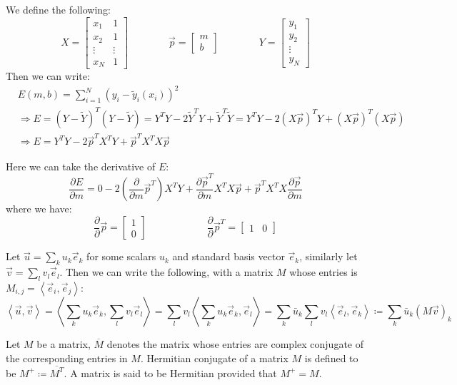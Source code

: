\documentclass[11pt]{article}
\theoremstyle{break}
\theoremstyle{break}
\begin{document}
We define the following:
$$X = \begin{bmatrix}
x_1 & 1 \\ x_2 & 1 \\ \vdots & \vdots \\ x_N &1 
\end{bmatrix} \qquad\qquad \vec{p} = \begin{bmatrix} m \\ b \end{bmatrix}
\qquad\qquad Y = \begin{bmatrix}
y_1\\ y_2 \\\vdots \\ y_N
\end{bmatrix} $$
Then we can write:
\begin{align*}
&E(m,b) =\sum_{i=1}^N ( y_i - \widetilde{y}_i(x_i) )^2 \\
&\Rightarrow E = (Y-\widetilde{Y})^T(Y-\widetilde{Y}) = Y^TY - 2\widetilde{Y}^TY + \widetilde{Y}^T\widetilde{Y} = Y^TY - 2(X\vec{p})^TY + (X\vec{p})^T (X\vec{p})\\
&\Rightarrow E = Y^TY-2\vec{p}^TX^TY + \vec{p}^TX^TX\vec{p}
\end{align*}

Here we can take the derivative of $E$:
$$\frac{\partial E}{\partial m} = 0 - 2\left(\frac{\partial}{\partial m} \vec{p}^T\right)X^TY + \frac{\partial \vec{p}^T}{\partial m}X^TX\vec{p} + \vec{p}^TX^TX \frac{\partial \vec{p}}{\partial m}$$
where we have:
$$\frac{\partial }{\partial }\vec{p} = \begin{bmatrix}
1 \\ 0
\end{bmatrix}\qquad\qquad\qquad \frac{\partial }{\partial }\vec{p}^T = \begin{bmatrix}
1 & 0
\end{bmatrix}$$

Let $\vec{u} = \sum_k u_k\vec{e}_k$ for some scalars $u_k$ and standard basis vector $\vec{e}_k$, similarly let $\vec{v} = \sum_l v_l \vec{e}_l$. Then we can write the following, with a matrix $M$ whose entries is $M_{i,j} = \left<\vec{e}_i,\vec{e}_j\right>$:
$$\left<\vec{u},\vec{v}\right> = \left<\sum_k u_k\vec{e}_k , \sum_l v_l \vec{e}_l\right> = \sum_l v_l\left<\sum_k u_k\vec{e}_k, \vec{e}_l\right> = \sum_k \bar{u}_k \sum_l v_l \left<\vec{e}_l, \vec{e}_k\right> \coloneqq \sum_k \bar{u}_k (M \vec{v})_k$$


Let $M$ be a matrix, $\overline{M}$ denotes the matrix whose entries are complex conjugate of the corresponding entries in $M$. Hermitian conjugate of a matrix $M$ is defined to be $M^+ \coloneqq \overline{M^T}$. A matrix is said to be Hermitian provided that $M^+ = M$. \\
\end{document}
